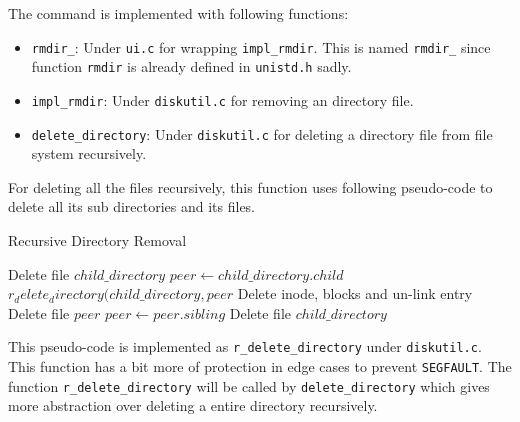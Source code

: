 \documentclass{homework}
\begin{document}
The command is implemented with following functions:
\begin{itemize}
    \item \texttt{rmdir_}: Under \texttt{ui.c} for wrapping \texttt{impl_rmdir}. This is named \texttt{rmdir_} since function \texttt{rmdir} is already defined in \texttt{unistd.h} sadly.
    \item \texttt{impl_rmdir}: Under \texttt{diskutil.c} for removing an directory file.
    \item \texttt{delete_directory}: Under \texttt{diskutil.c} for deleting a directory file from file system recursively.
\end{itemize}


For deleting all the files recursively, this function uses following pseudo-code to delete all its sub directories and its files.

\begin{algorithm}
\caption{Recursive Directory Removal}\label{alg:cap}
\begin{algorithmic}
     
        \State Delete file $child\_directory$
    \Else {}
        \State $peer \gets child\_directory.child$
         
                \State $r_delete_directory(child\_directory, peer$
                \State Delete inode, blocks and un-link entry
            \EndIf
            \State Delete file $peer$
            \State $peer \gets peer.sibling$
        \EndWhile
        \State Delete file $child\_directory$
    \EndIf
\end{algorithmic}
\end{algorithm}

This pseudo-code is implemented as \texttt{r_delete_directory} under \texttt{diskutil.c}. This function has a bit more of protection in edge cases to prevent \texttt{SEGFAULT}. The function \texttt{r_delete_directory} will be called by \texttt{delete_directory} which gives more abstraction over deleting a entire directory recursively.
\pagebreak
\end{document}
